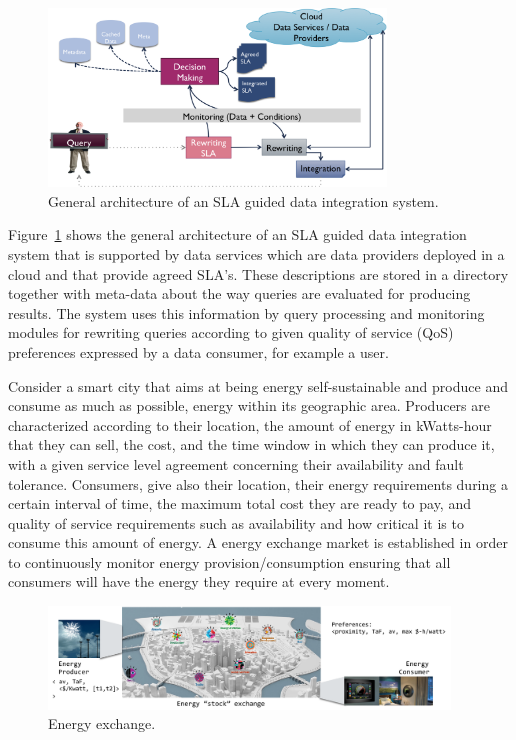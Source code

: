 \begin{figure}
\includegraphics[width=0.8\textwidth]{figs/arch.png}
\caption{General architecture of an SLA guided  data integration system.\label{fig:arch}}
\end{figure}

Figure~\ref{fig:arch} shows the general architecture of an SLA guided data integration system that is supported by data services which are data providers deployed in a cloud and that provide agreed SLA’s. 
These descriptions are stored in a directory together with meta-data about the way queries are evaluated for producing results. 
The system uses this information  by query processing and monitoring modules for rewriting queries according to given quality of service (QoS) preferences expressed by a data consumer, for example a user.


Consider a smart city that aims at being energy self-sustainable and produce and consume as much as possible, energy within its geographic area. 
Producers are characterized according to their location, the amount of energy in kWatts-hour that they can sell, the cost, and the time window in which they can produce it, with a given service level agreement concerning their availability and fault tolerance. 
Consumers, give also their location, their energy requirements during a certain interval of time, the maximum total cost they are ready to pay, and quality of service requirements such as availability and how critical it is to consume this amount of energy. 
A energy exchange market is established in order to continuously monitor energy provision/consumption ensuring that all consumers will have the energy they require at every moment.

\begin{figure}
\includegraphics[width=0.95\textwidth]{figs/exchange.pdf}
\caption{\label{fig:energyXChange} Energy exchange.}
\end{figure}


